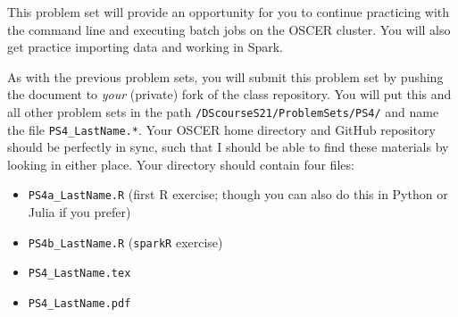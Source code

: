 \documentclass[12pt,english]{exam}
\begin{document}
This problem set will provide an opportunity for you to continue practicing with the command line and executing batch jobs on the OSCER cluster. You will also get practice importing data and working in Spark. 

As with the previous problem sets, you will submit this problem set by pushing the document to \emph{your} (private) fork of the class repository. You will put this and all other problem sets in the path \texttt{/DScourseS21/ProblemSets/PS4/} and name the file \texttt{PS4\_LastName.*}. Your OSCER home directory and GitHub repository should be perfectly in sync, such that I should be able to find these materials by looking in either place. Your directory should contain four files:
\begin{itemize}
    \item \texttt{PS4a\_LastName.R} (first R exercise; though you can also do this in Python or Julia if you prefer)
    \item \texttt{PS4b\_LastName.R} (\texttt{sparkR} exercise)
    \item \texttt{PS4\_LastName.tex}
    \item \texttt{PS4\_LastName.pdf}
\end{itemize}
\end{document}
